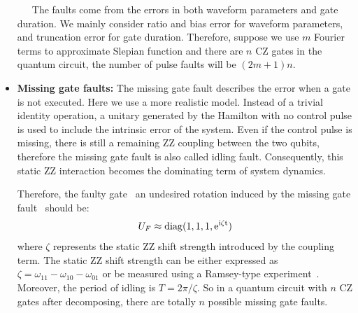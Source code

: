 \documentclass[conference, 9pt]{IEEEtran}
\begin{document}
\begin{itemize}
    \ \ \ The faults come from the errors in both waveform parameters and gate duration. We mainly consider ratio and bias error for waveform parameters, and truncation error for gate duration. Therefore, suppose we use $m$ Fourier terms to approximate Slepian function and there are $n$ CZ gates in the quantum circuit, the number of pulse faults will be \textbf{$(2m+1)n$}.
    \item \textbf{Missing gate faults:} 
    The missing gate fault describes the error when a gate is not executed. Here we use a more realistic model. Instead of a trivial identity operation, a unitary generated by the Hamilton with no control pulse is used to include the intrinsic error of the system. Even if the control pulse is missing, there is still a remaining ZZ coupling between the two qubits, therefore the missing gate fault is also called idling fault. Consequently, this static ZZ interaction becomes the dominating term of system dynamics. 
    
    Therefore, the faulty gate \textemdash \  an undesired rotation induced by the missing gate fault \textemdash  \ should be:
    \begin{equation}
       U_{F} \approx \rm{diag}(1,1,1,e^{i \zeta t})
    \end{equation}
 where $\zeta$ represents the static ZZ shift strength introduced by the coupling term. The static ZZ shift strength can be either expressed as $\zeta = \omega_{11} - \omega_{10} - \omega_{01}$ or be measured using a Ramsey-type experiment~\cite{PhysRevResearch.2.033447}. Moreover, the period of idling is $T= 2\pi/\zeta$. So in a quantum circuit with $n$ CZ gates after decomposing, there are totally $n$ possible missing gate faults. 
\end{itemize}
\end{document}
